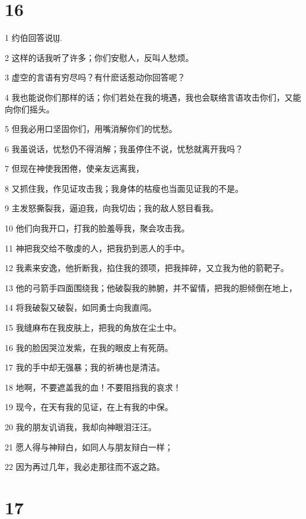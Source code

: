 \chapter{16}

\par 1 约伯回答说Ϣ.
\par 2 这样的话我听了许多；你们安慰人，反叫人愁烦。
\par 3 虚空的言语有穷尽吗？有什麽话惹动你回答呢？
\par 4 我也能说你们那样的话；你们若处在我的境遇，我也会联络言语攻击你们，又能向你们摇头。
\par 5 但我必用口坚固你们，用嘴消解你们的忧愁。
\par 6 我虽说话，忧愁仍不得消解；我虽停住不说，忧愁就离开我吗？
\par 7 但现在神使我困倦，使亲友远离我，
\par 8 又抓住我，作见证攻击我；我身体的枯瘦也当面见证我的不是。
\par 9 主发怒撕裂我，逼迫我，向我切齿；我的敌人怒目看我。
\par 10 他们向我开口，打我的脸羞辱我，聚会攻击我。
\par 11 神把我交给不敬虔的人，把我扔到恶人的手中。
\par 12 我素来安逸，他折断我，掐住我的颈项，把我摔碎，又立我为他的箭靶子。
\par 13 他的弓箭手四面围绕我；他破裂我的肺腑，并不留情，把我的胆倾倒在地上，
\par 14 将我破裂又破裂，如同勇士向我直闯。
\par 15 我缝麻布在我皮肤上，把我的角放在尘土中。
\par 16 我的脸因哭泣发紫，在我的眼皮上有死荫。
\par 17 我的手中却无强暴；我的祈祷也是清洁。
\par 18 地啊，不要遮盖我的血！不要阻挡我的哀求！
\par 19 现今，在天有我的见证，在上有我的中保。
\par 20 我的朋友讥诮我，我却向神眼泪汪汪。
\par 21 愿人得与神辩白，如同人与朋友辩白一样；
\par 22 因为再过几年，我必走那往而不返之路。

\chapter{17}

